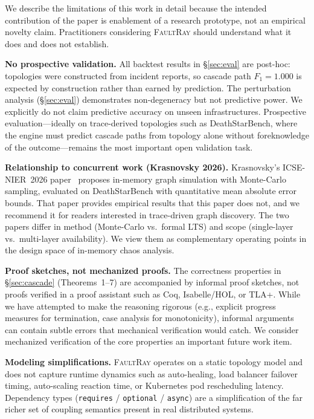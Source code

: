 \documentclass[10pt,twocolumn]{article}
\begin{document}
We describe the limitations of this work in detail because the
intended contribution of the paper is enablement of a research
prototype, not an empirical novelty claim. Practitioners considering
\textsc{FaultRay} should understand what it does and does not
establish.

\textbf{No prospective validation.}
All backtest results in \S\ref{sec:eval} are post-hoc: topologies
were constructed from incident reports, so cascade path $F_1 = 1.000$
is expected by construction rather than earned by prediction. The
perturbation analysis (\S\ref{sec:eval}) demonstrates non-degeneracy
but not predictive power. We explicitly do not claim predictive
accuracy on unseen infrastructures. Prospective evaluation---ideally
on trace-derived topologies such as DeathStarBench, where the engine
must predict cascade paths from topology alone without foreknowledge
of the outcome---remains the most important open validation task.

\textbf{Relationship to concurrent work (Krasnovsky 2026).}
Krasnovsky's ICSE-NIER~2026 paper~\cite{krasnovsky2026} proposes
in-memory graph simulation with Monte-Carlo sampling, evaluated on
DeathStarBench with quantitative mean absolute error bounds. That
paper provides empirical results that this paper does not, and we
recommend it for readers interested in trace-driven graph discovery.
The two papers differ in method (Monte-Carlo vs.\ formal LTS) and
scope (single-layer vs.\ multi-layer availability). We view them as
complementary operating points in the design space of in-memory
chaos analysis.

\textbf{Proof sketches, not mechanized proofs.}
The correctness properties in \S\ref{sec:cascade} (Theorems~1--7)
are accompanied by informal proof sketches, not proofs verified
in a proof assistant such as Coq, Isabelle/HOL, or TLA+. While
we have attempted to make the reasoning rigorous (e.g., explicit
progress measures for termination, case analysis for monotonicity),
informal arguments can contain subtle errors that mechanical
verification would catch. We consider mechanized verification of
the core properties an important future work item.

\textbf{Modeling simplifications.}
\textsc{FaultRay} operates on a static topology model and does not
capture runtime dynamics such as auto-healing, load balancer failover
timing, auto-scaling reaction time, or Kubernetes pod rescheduling
latency. Dependency types (\texttt{requires} / \texttt{optional} /
\texttt{async}) are a simplification of the far richer set of
coupling semantics present in real distributed systems.
\end{document}
